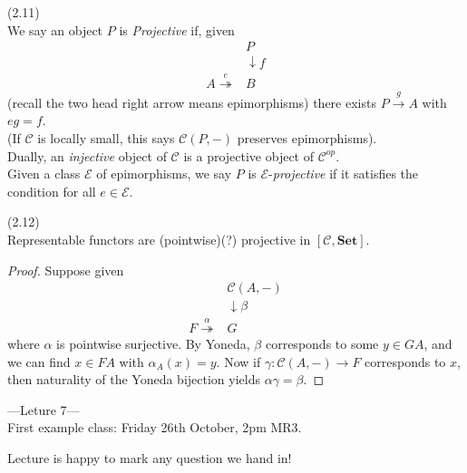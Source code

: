 \documentclass[a4paper]{article}
\begin{document}
\begin{defi} (2.11)\\
    We say an object $P$ is \emph{Projective} if, given 
    \begin{equation*}
        \begin{aligned}
            &P\\
            &\downarrow f\\
            A\stackrel{e}{\twoheadrightarrow}&B
        \end{aligned}
    \end{equation*}
    (recall the two head right arrow means epimorphisms) there exists $P \xrightarrow{g} A$ with $eg = f$.\\
    (If $\mathcal{C}$ is locally small, this says $\mathcal{C}(P,-)$ preserves epimorphisms).\\
    Dually, an \emph{injective} object of $\mathcal{C}$ is a projective object of $\mathcal{C}^{op}$.\\
    Given a class $\mathcal{E}$ of epimorphisms, we say $P$ is $\mathcal{E}$-\emph{projective} if it satisfies the condition for all $e \in \mathcal{E}$.
\end{defi}

\begin{lemma} (2.12)\\
    Representable functors are (pointwise)(?) projective in $[\mathcal{C},\mathbf{Set}]$.
    \begin{proof}
        Suppose given 
        \begin{equation*}
            \begin{aligned}
                &\mathcal{C}(A,-)\\
                &\downarrow \beta\\
                F\stackrel{\alpha}{\twoheadrightarrow}&G
            \end{aligned}
        \end{equation*}
        where $\alpha$ is pointwise surjective. By Yoneda, $\beta$ corresponds to some $y \in GA$, and we can find $x \in FA$ with $\alpha_A(x) = y$. Now if $\gamma:\mathcal{C}(A,-) \to F$ corresponds to $x$, then naturality of the Yoneda bijection yields $\alpha\gamma =\beta$.
    \end{proof}
\end{lemma}

---Leture 7---\\
First example class: Friday 26th October, 2pm MR3.

Lecture is happy to mark any question we hand in!
\end{document}
